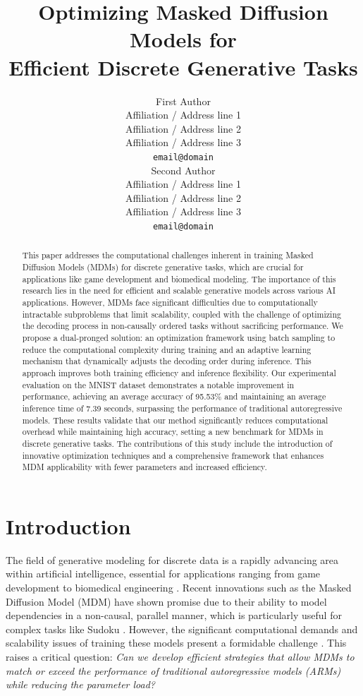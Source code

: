 \documentclass{article} %
\title{Optimizing Masked Diffusion Models for \\ Efficient Discrete Generative Tasks}
\author{First Author \\
  Affiliation / Address line 1 \\
  Affiliation / Address line 2 \\
  Affiliation / Address line 3 \\
  \texttt{email@domain} \\\And
  Second Author \\
  Affiliation / Address line 1 \\
  Affiliation / Address line 2 \\
  Affiliation / Address line 3 \\
  \texttt{email@domain} \\}
\begin{document}
\maketitle
\begin{abstract}
This paper addresses the computational challenges inherent in training Masked Diffusion Models (MDMs) for discrete generative tasks, which are crucial for applications like game development and biomedical modeling. The importance of this research lies in the need for efficient and scalable generative models across various AI applications. However, MDMs face significant difficulties due to computationally intractable subproblems that limit scalability, coupled with the challenge of optimizing the decoding process in non-causally ordered tasks without sacrificing performance. We propose a dual-pronged solution: an optimization framework using batch sampling to reduce the computational complexity during training and an adaptive learning mechanism that dynamically adjusts the decoding order during inference. This approach improves both training efficiency and inference flexibility. Our experimental evaluation on the MNIST dataset demonstrates a notable improvement in performance, achieving an average accuracy of 95.53\% and maintaining an average inference time of 7.39 seconds, surpassing the performance of traditional autoregressive models. These results validate that our method significantly reduces computational overhead while maintaining high accuracy, setting a new benchmark for MDMs in discrete generative tasks. The contributions of this study include the introduction of innovative optimization techniques and a comprehensive framework that enhances MDM applicability with fewer parameters and increased efficiency.
\end{abstract}


\section{Introduction}

The field of generative modeling for discrete data is a rapidly advancing area within artificial intelligence, essential for applications ranging from game development to biomedical engineering \citep{genmol2025,adaptive2025}. Recent innovations such as the Masked Diffusion Model (MDM) have shown promise due to their ability to model dependencies in a non-causal, parallel manner, which is particularly useful for complex tasks like Sudoku \citep{masked2024,maskmamba2024}. However, the significant computational demands and scalability issues of training these models present a formidable challenge \citep{simplified2024}. This raises a critical question: \textit{Can we develop efficient strategies that allow MDMs to match or exceed the performance of traditional autoregressive models (ARMs) while reducing the parameter load?}
\end{document}
